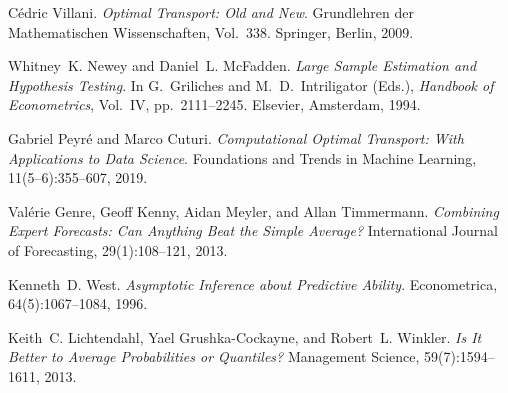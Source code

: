 C{\'e}dric Villani.
\textit{Optimal Transport: Old and New}.
Grundlehren der Mathematischen Wissenschaften, Vol.~338.
Springer, Berlin, 2009.

Whitney~K. Newey and Daniel~L. McFadden.
\textit{Large Sample Estimation and Hypothesis Testing}.
In G.~Griliches and M.~D.~Intriligator (Eds.),
\textit{Handbook of Econometrics}, Vol.~IV, pp.~2111--2245.
Elsevier, Amsterdam, 1994.

Gabriel Peyr{\'e} and Marco Cuturi.
\textit{Computational Optimal Transport: With Applications to Data Science}.
Foundations and Trends in Machine Learning, 11(5--6):355--607, 2019.

Val{\'e}rie Genre, Geoff Kenny, Aidan Meyler, and Allan Timmermann.
\textit{Combining Expert Forecasts: Can Anything Beat the Simple Average?}
International Journal of Forecasting, 29(1):108--121, 2013.

Kenneth~D. West.
\textit{Asymptotic Inference about Predictive Ability}.
Econometrica, 64(5):1067--1084, 1996.

Keith~C. Lichtendahl, Yael Grushka-Cockayne, and Robert~L. Winkler.
\textit{Is It Better to Average Probabilities or Quantiles?}
Management Science, 59(7):1594--1611, 2013.
